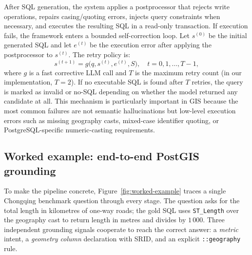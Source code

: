 \documentclass[11pt]{article}
\begin{document}
After SQL generation, the system applies a postprocessor that rejects write operations, repairs casing/quoting errors, injects query constraints when necessary, and executes the resulting SQL in a read-only transaction. If execution fails, the framework enters a bounded self-correction loop. Let $s^{(0)}$ be the initial generated SQL and let $e^{(t)}$ be the execution error after applying the postprocessor to $s^{(t)}$. The retry policy is:
\begin{equation}
  s^{(t+1)} = g\big(q, s^{(t)}, e^{(t)}, S\big), \quad t = 0,1,\dots,T-1,
\end{equation}
where $g$ is a fast corrective LLM call and $T$ is the maximum retry count (in our implementation, $T=2$). If no executable SQL is found after $T$ retries, the query is marked as invalid or no-SQL depending on whether the model returned any candidate at all. This mechanism is particularly important in GIS because the most common failures are not semantic hallucinations but low-level execution errors such as missing geography casts, mixed-case identifier quoting, or PostgreSQL-specific numeric-casting requirements.

\subsection{Worked example: end-to-end PostGIS grounding}
\label{sec:worked-example}

To make the pipeline concrete, Figure~\ref{fig:worked-example} traces a single Chongqing benchmark question through every stage. The question asks for the total length in kilometres of one-way roads; the gold SQL uses \texttt{ST\_Length} over the geography cast to return length in metres and divides by $1\,000$. Three independent grounding signals cooperate to reach the correct answer: a \emph{metric} intent, a \emph{geometry column} declaration with SRID, and an explicit \texttt{::geography} rule.
\end{document}

